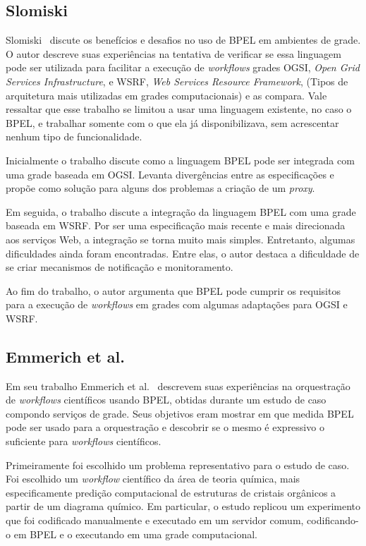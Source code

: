 \documentclass[12pt]{report} %
\begin{document}

	\subsection{Slomiski}
	    Slomiski~\cite{Slomiski06} discute os benefícios e desafios no uso de BPEL em ambientes de grade.
	    O autor descreve suas experiências na tentativa de verificar se essa linguagem pode ser utilizada para facilitar a execução de \textit{workflows} grades OGSI, \textit{Open Grid Services Infrastructure}, e WSRF, \textit{Web Services Resource Framework}, (Tipos de arquitetura mais utilizadas em grades computacionais) e as compara.
	    Vale ressaltar que esse trabalho se limitou a usar uma linguagem existente, no caso o BPEL, e trabalhar somente com o que ela já disponibilizava, sem acrescentar nenhum tipo de funcionalidade.
	    
	    Inicialmente o trabalho discute como a linguagem BPEL pode ser integrada com uma grade baseada em OGSI.
	    Levanta divergências entre as especificações e propõe como solução para alguns dos problemas a criação de um \textit{proxy}.

	    Em seguida, o trabalho discute a integração da linguagem BPEL com uma grade baseada em WSRF.
	    Por ser uma especificação mais recente e mais direcionada aos serviços Web, a integração se torna muito mais simples.
	    Entretanto, algumas dificuldades ainda foram encontradas.
	    Entre elas, o autor destaca a dificuldade de se criar mecanismos de notificação e monitoramento.

	    Ao fim do trabalho, o autor argumenta que BPEL pode cumprir os requisitos para a execução de \textit{workflows} em grades com algumas adaptações para OGSI e WSRF.  

  
	\subsection{Emmerich et al.}
	    Em seu trabalho Emmerich et al.~\cite{Emmerich05} descrevem suas experiências na orquestração de \textit{workflows} científicos usando BPEL, obtidas durante um estudo de caso compondo serviços de grade.
	    Seus objetivos eram mostrar em que medida BPEL pode ser usado para a orquestração e descobrir se o mesmo é expressivo o suficiente para \textit{workflows} científicos.
	    
	    Primeiramente foi escolhido um problema representativo para o estudo de caso.
	    Foi escolhido um \textit{workflow} científico da área de teoria química, mais especificamente predição computacional de estruturas de cristais orgânicos a partir de um diagrama químico.
	    Em particular, o estudo replicou um experimento que foi codificado manualmente e executado em um servidor comum, codificando-o em BPEL e o executando em uma grade computacional.
\end{document}
